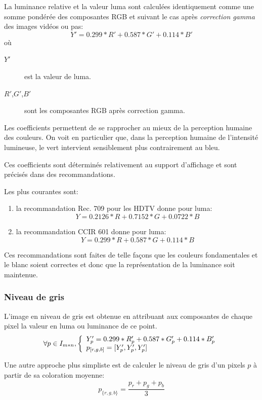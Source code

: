 \documentclass[a4paper,12pt]{report}
\begin{document}
La luminance relative et la valeur luma sont calculées identiquement comme une somme pondérée des composantes RGB et suivant le cas après \textit{correction gamma} des images vidéos ou pas:
$$ Y' = 0.299*R' + 0.587*G' + 0.114*B' $$
où
\begin{description}
\item[$Y'$] est la valeur de luma.
\item[$R'$,$G'$,$B'$] sont les composantes RGB après correction gamma.\\
\end{description}

Les coefficients permettent de se rapprocher au mieux de la perception humaine des couleurs. On voit en particulier que, dans la perception humaine de l'intensité lumineuse, le vert intervient sensiblement plus contrairement au bleu.

Ces coefficients sont déterminés relativement au support d'affichage et sont précisés dans des recommandations. 

Les plus courantes sont:
\begin{enumerate}
\item la recommandation Rec. 709 pour les HDTV donne pour luma: 
$$Y =  0.2126*R+0.7152*G+0.0722*B $$ 
\item la recommandation CCIR 601 donne pour luma: 
$$Y =  0.299*R+0.587*G+0.114*B $$
\end{enumerate}
Ces recommandations sont faites de telle façons que les couleurs fondamentales et le blanc soient correctes et donc que la représentation de la luminance soit maintenue.\\


\subsubsection*{Niveau de gris}

L'image en niveau de gris est obtenue en attribuant aux composantes de chaque pixel la valeur en luma ou luminance de ce point.
$$
	\forall p \in I_{m*n}, \left\{
	\begin{array}{l l}
	Y'_p = 0.299*R'_p + 0.587*G_p' + 0.114*B'_p \\ 
	p_{[r,g,b]} = [Y'_p,Y'_p,Y'_p] 
	\end{array} \right.
$$


Une autre approche plus simpliste est de calculer le niveau de gris d'un pixels $p$ à partir de sa coloration moyenne: \[p_{\{r,g,b\}} =\frac{p_r+p_g+p_b}{3}\]

\pagebreak
\end{document}
